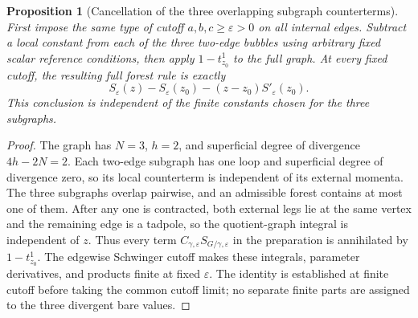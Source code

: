 \documentclass[11pt,a4paper,oneside]{article}
\theoremstyle{plain}
\newtheorem{proposition}[theorem]{Proposition}
\theoremstyle{definition}
\theoremstyle{remark}
\numberwithin{equation}{section}
\begin{document}
\begin{proposition}[Cancellation of the three overlapping subgraph counterterms]\label{sunsetjet:prop:forest}
First impose the same type of cutoff $a,b,c\geq\varepsilon>0$ on all internal edges.
Subtract a local constant from each of the three two-edge bubbles using arbitrary fixed scalar reference conditions,
then apply $1-t_{z_0}^1$ to the full graph.
At every fixed cutoff, the resulting full forest rule is exactly
\begin{equation}\label{sunsetjet:eq:regulated}
 S_\varepsilon(z)-S_\varepsilon(z_0)
          -(z-z_0)S'_\varepsilon(z_0).
\end{equation}
This conclusion is independent of the finite constants chosen for the three subgraphs.
\end{proposition}
\begin{proof}
The graph has $N=3$, $h=2$, and superficial degree of divergence $4h-2N=2$.
Each two-edge subgraph has one loop and superficial degree of divergence zero, so its local counterterm is independent of its external momenta.
The three subgraphs overlap pairwise, and an admissible forest contains at most one of them.
After any one is contracted, both external legs lie at the same vertex and the remaining edge is a tadpole,
so the quotient-graph integral is independent of $z$.
Thus every term $C_{\gamma,\varepsilon}S_{G/\gamma,\varepsilon}$ in the preparation
is annihilated by $1-t_{z_0}^1$.
The edgewise Schwinger cutoff makes these integrals, parameter derivatives, and products finite at fixed $\varepsilon$.
The identity is established at finite cutoff before taking the common cutoff limit; no separate finite parts are assigned to the three divergent bare values.
\end{proof}
\end{document}
